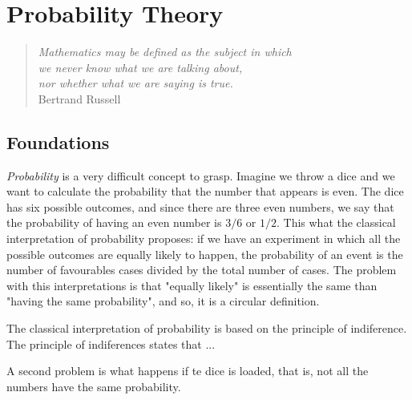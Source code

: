 %
%


\chapter{Probability Theory}
\label{chap:Probability Theory}

\begin{quote}
\begin{flushright}
\emph{Mathematics may be defined as the subject in which\\
we never know what we are talking about,\\
nor whether what we are saying is true.}\\
Bertrand Russell
\end{flushright}
\end{quote}
\bigskip

%
%

\section{Foundations}
\label{sec:probability_foundations}

\emph{Probability} is a very difficult concept to grasp. Imagine we throw a dice and we want to calculate the probability that the number that appears is even. The dice has six possible outcomes, and since there are three even numbers, we say that the probability of having an even number is $3/6$ or $1/2$. This what the classical interpretation of probability proposes: if we have an experiment in which all the possible outcomes are equally likely to happen, the probability of an event is the number of favourables cases divided by the total number of cases. The problem with this interpretations is that "equally likely" is essentially the same than "having the same probability", and so, it is a circular definition. 

The classical interpretation of probability is based on the principle of indiference. The principle of indiferences states that ...

A second problem is what happens if te dice is loaded, that is, not all the numbers have the same probability.

